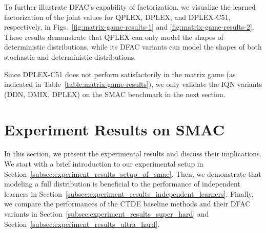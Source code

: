 \documentclass[twoside,11pt]{article}
\begin{document}
To further illustrate DFAC's capability of factorization, we visualize the learned factorization of the joint values for QPLEX, DPLEX, and DPLEX-C51, respectively, in Figs.~\ref{fig:matrix-game-results-1} and \ref{fig:matrix-game-results-2}. These results demonstrate that QPLEX can only model the shapes of deterministic distributions, while its DFAC variants can model the shapes of both stochastic and deterministic distributions.

Since DPLEX-C51 does not perform satisfactorily in the matrix game (as indicated in Table~\ref{table:matrix-game-results}), we only validate the IQN variants (DDN, DMIX, DPLEX) on the SMAC benchmark in the next section.
 \section{Experiment Results on SMAC}
\label{sec:experiment_results}

In this section, we present the experimental results and discuss their implications. We start with a brief introduction to our experimental setup in Section~\ref{subsec:experiment_results_setup_of_smac}. Then, we demonstrate that modeling a full distribution is beneficial to the performance of independent learners in Section~\ref{subsec:experiment_results_independent_learners}. Finally, we compare the performances of the CTDE baseline methods and their DFAC variants in Section~\ref{subsec:experiment_results_super_hard} and Section~\ref{subsec:experiment_results_ultra_hard}.
\end{document}
